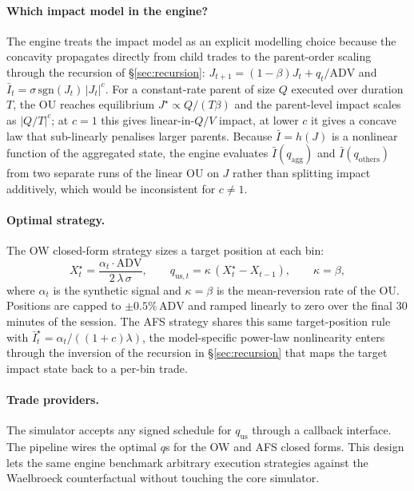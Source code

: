 \documentclass[11pt,a4paper]{article}
\begin{document}
\paragraph{Which impact model in the engine?}
The engine treats the impact model as an explicit modelling choice
because the concavity propagates directly from child trades to the
parent-order scaling through the recursion of \S\ref{sec:recursion}:
$J_{t+1} = (1-\beta)J_t + q_t/\mathrm{ADV}$ and
$\bar I_t = \sigma\,\mathrm{sgn}(J_t)\,|J_t|^{c}$.
For a constant-rate parent of size $Q$ executed over duration $T$,
the OU reaches equilibrium $J^\star \propto Q/(T\beta)$ and the
parent-level impact scales as $|Q/T|^{c}$; at $c = 1$ this gives
linear-in-$Q/V$ impact, at lower $c$ it gives a concave law that
sub-linearly penalises larger parents.  Because $\bar I = h(J)$ is a
nonlinear function of the aggregated state, the engine evaluates
$\bar I(q_{\text{agg}})$ and $\bar I(q_{\text{others}})$ from two
separate runs of the linear OU on $J$ rather than splitting impact
additively, which would be inconsistent for $c \ne 1$.

\paragraph{Optimal strategy.}
The OW closed-form strategy sizes a target position at each bin:
\[
  X^\star_t = \frac{\alpha_t \cdot \mathrm{ADV}}{2\,\lambda\,\sigma},
  \qquad
  q_{\text{us},t} = \kappa\,(X^\star_t - X_{t-1}),
  \qquad
  \kappa = \beta,
\]
where $\alpha_t$ is the synthetic signal and $\kappa = \beta$ is the
mean-reversion rate of the OU.  Positions are capped to
$\pm 0.5\%\,\mathrm{ADV}$ and ramped linearly to zero over the
final 30 minutes of the session.  The AFS strategy shares this same
target-position rule with $\bar I^\star_t = \alpha_t/((1+c)\lambda)$, the model-specific power-law nonlinearity enters through the inversion of the recursion in \S\ref{sec:recursion} that maps the target impact state back to a per-bin trade.

\paragraph{Trade providers.}
The simulator accepts any signed schedule for $q_{\text{us}}$ through a callback interface. The pipeline wires the optimal $q$s for the OW and AFS closed forms. This design lets the same engine benchmark arbitrary execution strategies against the Waelbroeck counterfactual without touching the core simulator.
\end{document}
